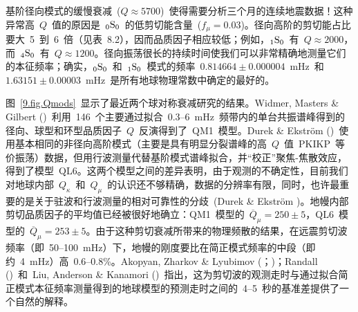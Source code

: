 基阶径向模式的缓慢衰减~($Q\approx 5700$)~使得需要分析三个月的连续地震数据！这种异常高~$Q$~值的原因是~${}_0{\rm S}_0$~的低剪切能含量~($f_{\mu}=0.03$)。径向高阶的剪切能占比要大~5~到~6~倍（见表~8.2），因而品质因子相应较低；例如，${}_1{\rm S}_0$~有~$Q\approx 2000$，而~${}_4{\rm S}_0$~有~$Q\approx 1200$。径向振荡很长的持续时间使我们可以非常精确地测量它们的本征频率；确实，${}_0{\rm S}_0$~和~${}_1{\rm S}_0$~模式的频率~$0.814664\pm 0.000004$~mHz~和~$1.63151\pm 0.00003$~mHz~是所有地球物理常数中确定的最好的。

图~\ref{9.fig.Qmods}~显示了最近两个球对称衰减研究的结果。Widmer, Masters
\& Gilbert (\citeyear{widmer&al91})~利用~146~个主要通过拟合~0.3--6~mHz~频带内的单台共振谱峰得到的径向、球型和环型品质因子~$Q$~反演得到了~QM1~模型。Durek \& Ekstr\"{o}m (\citeyear{durek&ekstrom96})~使用基本相同的非径向高阶模式（主要是具有明显分裂谱峰的高~$Q$~值~PKIKP~等价振荡）数据，但用行波测量代替基阶模式谱峰拟合，并“校正”聚焦-焦散效应，得到了模型~QL6。这两个模型之间的差异表明，由于观测的不确定性，目前我们对地球内部~$Q_{\kappa}$~和~$Q_{\mu}$~的认识还不够精确，数据的分辨率有限，同时，也许最重要的是关于驻波和行波测量的相对可靠性的分歧~(Durek \& Ekstr\"{o}m \citeyear{durek&ekstrom97})。地幔内部剪切品质因子的平均值已经被很好地确立：QM1~模型的~$\overline{Q}_{\mu}=250\pm 5$，QL6~模型的~$\overline{Q}_{\mu}=253\pm 5$。由于这种剪切衰减所带来的物理频散的结果，在远震剪切波频率（即~50--100~mHz）下，地幔的刚度要比在简正模式频率的中段（即约~4~mHz）高~0.6--0.8\%。Akopyan, Zharkov \& Lyubimov (\citeyear{akopyan&al75}；\citeyear{akopyan&al76})；Randall (\citeyear{randall76})~和~Liu, Anderson \& Kanamori (\citeyear{liu&al76})~指出，这为剪切波的观测走时与通过拟合简正模式本征频率测量得到的地球模型的预测走时之间的~4--5~秒的基准差提供了一个自然的解释。

